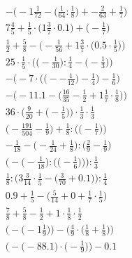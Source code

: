\documentclass[8pt]{article}
\begin{document}
\begin{align}
-\Big(-1\frac{1}{72} - \big(\frac{1}{64} : \frac{1}{8}\big) + -\frac{2}{63} + \frac{1}{7}\Big) \\
7\frac{4}{5} + \frac{1}{5} \cdot \big(1\frac{3}{7} \cdot 0.1\big) + \big(-\frac{1}{7}\big) \\
\frac{1}{2} + \frac{5}{8} - \Big(-\frac{1}{56} + 1\frac{3}{7} \cdot \big(0.5 \cdot \frac{1}{5}\big)\Big) \\
25 \cdot \frac{1}{5} \cdot \Big(\big(-\frac{1}{30}\big) : \frac{1}{4} - \big(-\frac{1}{3}\big)\Big) \\
-\bigg(-7 \cdot \Big(\big(--\frac{1}{12}\big) - \frac{1}{4}\Big) - \frac{1}{6}\bigg) \\
-\Big(-11.1 - \big(\frac{16}{35} - \frac{1}{2} + 1\frac{1}{7} \cdot \frac{1}{8}\big)\Big) \\
36 \cdot \Big(\frac{9}{20} + \big(-\frac{1}{5}\big)\Big) \cdot \frac{1}{3} \cdot \frac{1}{3} \\
\Big(-\frac{191}{504} - \frac{1}{9}\Big) + \frac{1}{8} : \Big(\big(-\frac{1}{7}\big)\Big) \\
-\frac{1}{18} - \big(-\frac{1}{24} + \frac{1}{8}\big) : \big(\frac{2}{9} - \frac{1}{9}\big) \\
\bigg(-\Big(-\frac{1}{18}\Big) : \Big(\big(-\frac{1}{6}\big)\Big)\bigg) : \frac{1}{3} \\
\frac{1}{8} : \Big(3\frac{3}{14} \cdot \frac{1}{5} - \big(\frac{3}{70} + 0.1\big)\Big) : \frac{1}{4} \\
0.9 + \frac{1}{5} - \big(\frac{5}{14} + 0 + \frac{1}{7} \cdot \frac{1}{5}\big) \\
\frac{7}{8} + \frac{5}{8} - \frac{1}{2} + 1 \cdot \frac{1}{8} \cdot \frac{1}{2} \\
\Big(-\big(-1\frac{1}{9}\big)\Big) - \Big(\frac{4}{9} \cdot \big(\frac{1}{8} + \frac{1}{8}\big)\Big) \\
\Big(-\big(-88.1\big) \cdot \big(-\frac{1}{9}\big)\Big) - 0.1
\end{align}
\end{document}
